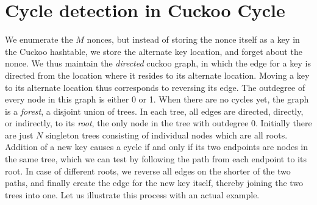 \documentclass[11pt, oneside]{article}
\begin{document}
\section{Cycle detection in Cuckoo Cycle}
We enumerate the $M$ nonces, but instead of storing the nonce itself as a key
in the Cuckoo hashtable, we store the alternate key location,
and forget about the nonce.  We thus maintain the {\em directed}
cuckoo graph, in which the edge for a key is directed from the location where
it resides to its alternate location.  Moving a key to its alternate location
thus corresponds to reversing its edge.  The outdegree of every node in this
graph is either 0 or 1.  When there are no cycles yet, the graph is a {\em
forest}, a disjoint union of trees.  In each tree, all edges are directed,
directly, or indirectly, to its {\em root}, the only node in the tree with
outdegree 0.  Initially there are just $N$ singleton trees consisting of
individual nodes which are all roots.
Addition of a new key causes a cycle if and only if its two endpoints are
nodes in the same tree, which we can test by following the path from each
endpoint to its root.
In case of different roots, we reverse all edges on the shorter of the two
paths, and finally create the edge for the new key itself, thereby joining
the two trees into one. Let us illustrate this process with an actual example.
\end{document}
